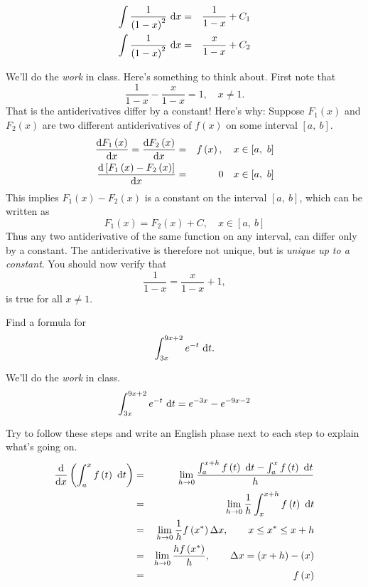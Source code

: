 \documentclass[12pt,addpoints, answers, fleqn]{exam}
\begin{document}
\begin{questions}
\begin{eqnarray*}
\int \frac{1}{\left(1-x\right)^2} \ {\rm{d}}x &=& \frac{1}{1-x} + C_1\\
\int \frac{1}{\left(1-x\right)^2} \ {\rm{d}}x &=& \frac{x}{1-x} + C_2\\
\end{eqnarray*}


\begin{solution}
We'll do the \emph{work} in class.
Here's something to think about. First note that
\[
\frac{1}{1-x}  - \frac{x}{1-x}  = 1, \quad x \neq 1.
\]
That is the antiderivatives differ by a constant!  Here's why: Suppose $F_1\left(x\right)$ and $F_2\left(x\right)$ are two different antiderivatives of $f\left(x\right)$ on some interval $\left[a, \ b \right]$.
\begin{eqnarray*}
\frac{{\rm{d}} F_1\left(x\right)}{{\rm{d}} x} =  \frac{{\rm{d}} F_2\left(x\right)}{{\rm{d}} x}  &=& f\left(x\right), \quad x \in \left[a, \ b \right]\\
\frac{{\rm{d}} \left[ F_1\left(x\right) - F_2\left(x\right) \right]}{{\rm{d}} x} &=&  0 \quad x \in \left[a, \ b \right]
\end{eqnarray*}
This implies $F_1\left(x\right) - F_2\left(x\right)$ is a constant on the interval $\left[a, \ b \right]$, which can be written as
\[
F_1\left(x\right) = F_2\left(x\right) + C, \quad x \in \left[a, \ b \right]
\]
Thus any two antiderivative of the same function on any interval, can differ only by a constant. The antiderivative is therefore not unique, but is \emph{unique up to a constant}. You should now verify that
\[
\frac{1}{1-x}  = \frac{x}{1-x}  + 1,
\]
is true for all $x \neq 1$.
\end{solution}






\question Find a formula for
\[
\int_{3x}^{9x+2} e^{-t} \ {\rm{d}}t.
\]

\begin{solution}
We'll do the \emph{work} in class.
\[
\int_{3x}^{9x+2} e^{-t} \ {\rm{d}}t = e^{-3x} - e^{-9x-2}
\]
\end{solution}


\question Try to follow these steps and write an English phase next to each step to explain what's going on.
\begin{eqnarray*}
\frac{{\rm{d}}}{{\rm{d}} x} \left( \int_a^x f \left( t \right) \ {\rm{d}}t \right) &=& \lim_{h \to 0} \frac{ \int_a^{x+h} f \left( t \right) \ {\rm{d}}t -  \int_a^x f \left( t \right) \ {\rm{d}}t}{h} \\
&=& \lim_{h \to 0} \frac{1}{h} \int_x^{x+h} f \left( t \right) \ {\rm{d}}t \\
&=& \lim_{h \to 0} \frac{1}{h} f\left(x^*\right) \Delta x, \qquad x \leq x^* \leq x+h\\
&=&    \lim_{h \to 0} \frac{h f\left(x^* \right)}{h}, \qquad  \Delta x = \left( x+ h \right) - \left( x \right)\\
&=& f\left(x \right)
\end{eqnarray*}




\end{questions}
\end{document}
